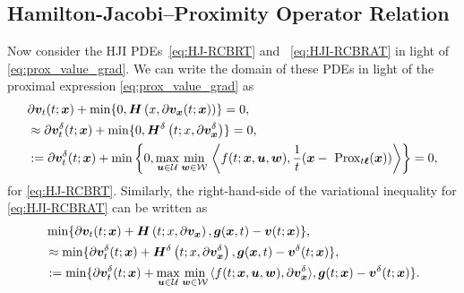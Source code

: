 \subsection{Hamilton-Jacobi--Proximity Operator Relation}
%
Now consider the HJI PDEs~\eqref{eq:HJ-RCBRT} and ~\eqref{eq:HJI-RCBRAT} in light of \eqref{eq:prox_value_grad}. We can write the domain of these PDEs in light of the proximal expression \eqref{eq:prox_value_grad} as 
%
\begin{align}
&\partial \valuefunc_t(t; \state) + \min\{0, \hamfunc\left(x, \partial \valuefunc_{\state}(t; \state)\right)\} = 0, \nonumber \\
%
&\approx \partial \valuefunc^\delta_t(t; \state) + \min\{0, %
\hamfunc^\delta\left(t; x, \partial \valuefunc^\delta_{\state}\right)\} = 0, \nonumber \\
%
&:= \partial \valuefunc^\delta_t(t; \state) + \min\bigg\{0, %
\max_{\control \in \mathcal{U}} \min_{\disturb \in \mathcal{W}} \, \bigg\langle f(t; \state, \bm{u}, \bm{w}),  \frac{1}{t}(\state - \prox_{t\term}(\state)) \bigg\rangle
\bigg\} = 0,
\end{align}
%
for \eqref{eq:HJ-RCBRT}.
%
Similarly, the right-hand-side of the variational inequality for \eqref{eq:HJI-RCBRAT} can be written as %
%
	\begin{align}
	&\min\{\partial \bm{v}_t(t; \bm{x}) + \bm{H}\left(t; x, \partial \bm{v}_{\bm{x}}\right), \bm{g}(\bm{x}, t) - \bm{v}(t; \bm{x})\}, \nonumber \\
	&\approx \min\{\partial \bm{v}^\delta_t(t; \bm{x}) + \bm{H}^\delta\left(t; x, \partial \bm{v}^\delta_{\bm{x}}\right), \bm{g}(\bm{x}, t) - \bm{v}^\delta(t; \bm{x})\}, \nonumber \\
	&:= \min\{\partial \bm{v}^\delta_t(t; \bm{x}) +  \max_{\bm{u} \in \mathcal{U}} \min_{\bm{w} \in \mathcal{W}} \, \langle f(t; \bm{x}, \bm{u}, \bm{w}), \partial \bm{v}_{\bm{x}}^\delta  \rangle,  \bm{g}(t; \bm{x}) - \bm{v}^\delta(t; \bm{x})\}. 
	\label{eq:hji_prox_pre}
	\end{align} 
